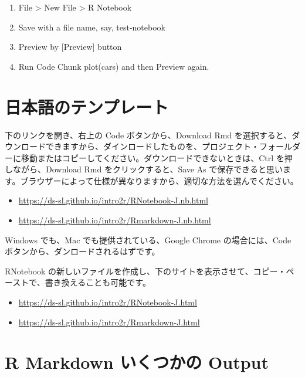 \documentclass[
  xelatex, ja=standard]{bxjsbook}
\providecommand{\tightlist}{%
  \setlength{\itemsep}{0pt}\setlength{\parskip}{0pt}}
\theoremstyle{definition}
\theoremstyle{definition}
\theoremstyle{definition}
\theoremstyle{definition}
\theoremstyle{remark}
\begin{document}
\begin{enumerate}
\def\labelenumi{\arabic{enumi}.}
\tightlist
\item
  File \textgreater{} New File \textgreater{} R Notebook
\item
  Save with a file name, say, test-notebook
\item
  Preview by {[}Preview{]} button
\item
  Run Code Chunk plot(cars) and then Preview again.
\end{enumerate}

\hypertarget{ux65e5ux672cux8a9eux306eux30c6ux30f3ux30d7ux30ecux30fcux30c8}{%
\section{日本語のテンプレート}\label{ux65e5ux672cux8a9eux306eux30c6ux30f3ux30d7ux30ecux30fcux30c8}}

下のリンクを開き、右上の Code ボタンから、Download Rmd を選択すると、ダウンロードできますから、ダインロードしたものを、プロジェクト・フォールダーに移動またはコピーしてください。ダウンロードできないときは、Ctrl を押しながら、Download Rmd をクリックすると、Save As で保存できると思います。ブラウザーによって仕様が異なりますから、適切な方法を選んでください。

\begin{itemize}
\tightlist
\item
  \url{https://ds-sl.github.io/intro2r/RNotebook-J.nb.html}
\item
  \url{https://ds-sl.github.io/intro2r/Rmarkdown-J.nb.html}
\end{itemize}

Windows でも、Mac でも提供されている、Google Chrome の場合には、Code ボタンから、ダンロードされるはずです。

RNotebook の新しいファイルを作成し、下のサイトを表示させて、コピー・ペーストで、書き換えることも可能です。

\begin{itemize}
\tightlist
\item
  \url{https://ds-sl.github.io/intro2r/RNotebook-J.html}
\item
  \url{https://ds-sl.github.io/intro2r/Rmarkdown-J.html}
\end{itemize}

\hypertarget{r-markdown-ux3044ux304fux3064ux304bux306e-output}{%
\section{R Markdown いくつかの Output}\label{r-markdown-ux3044ux304fux3064ux304bux306e-output}}
\end{document}
